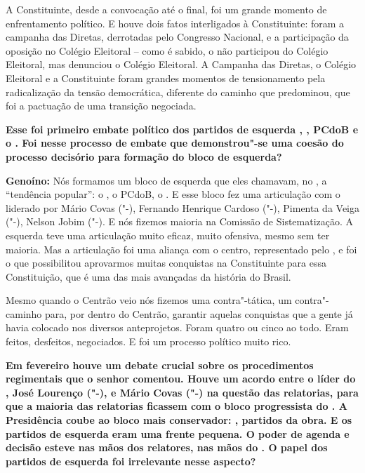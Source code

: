 A Constituinte, desde a convocação até o final, foi um grande momento de
enfrentamento político. E houve dois fatos interligados à Constituinte:
foram a campanha das Diretas, derrotadas pelo Congresso Nacional, e a
participação da oposição no Colégio Eleitoral -- como é sabido, o  não
participou do Colégio Eleitoral, mas denunciou o Colégio Eleitoral. A
Campanha das Diretas, o Colégio Eleitoral e a Constituinte foram grandes
momentos de tensionamento pela radicalização da tensão democrática,
diferente do caminho que predominou, que foi a pactuação de uma
transição negociada.

\textbf{Esse foi primeiro embate político dos partidos de esquerda ,
, PCdoB e o . Foi nesse processo de embate que demonstrou"-se uma
coesão do processo decisório para formação do bloco de esquerda?}

\textbf{Genoíno:} Nós formamos um bloco de esquerda que eles chamavam,
no , a ``tendência popular'': o , o PCdoB, o . E esse bloco fez
uma articulação com o  liderado por Mário Covas ("-), Fernando
Henrique Cardoso ("-), Pimenta da Veiga ("-), Nelson Jobim
("-). E nós fizemos maioria na Comissão de Sistematização. A
esquerda teve uma articulação muito eficaz, muito ofensiva, mesmo sem
ter maioria. Mas a articulação foi uma aliança com o centro,
representado pelo , e foi o que possibilitou aprovarmos muitas
conquistas na Constituinte para essa Constituição, que é uma das mais
avançadas da história do Brasil.

Mesmo quando o Centrão veio nós fizemos uma contra"-tática, um
contra"-caminho para, por dentro do Centrão, garantir aquelas conquistas
que a gente já havia colocado nos diversos anteprojetos. Foram quatro ou
cinco ao todo. Eram feitos, desfeitos, negociados. E foi um processo
político muito rico.

\textbf{Em fevereiro houve um debate crucial sobre os procedimentos
regimentais que o senhor comentou. Houve um acordo entre o líder do ,
José Lourenço ("-), e Mário Covas ("-) na questão das
relatorias, para que a maioria das relatorias ficassem com o bloco
progressista do . A Presidência coube ao bloco mais conservador:
, partidos da obra. E os partidos de esquerda eram uma frente
pequena. O poder de agenda e decisão esteve nas mãos dos relatores, nas
mãos do . O papel dos partidos de esquerda foi irrelevante nesse
aspecto?}

